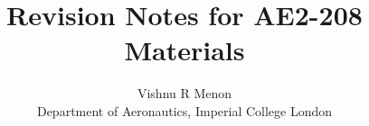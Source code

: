 \documentclass{summary_notes}
\begin{document}
\title{\bf Revision Notes for AE2-208 Materials}
\author{Vishnu R Menon\\ 
\small{Department of Aeronautics, Imperial College London}}
\maketitle
\tableofcontents
\newpage





\end{document}

